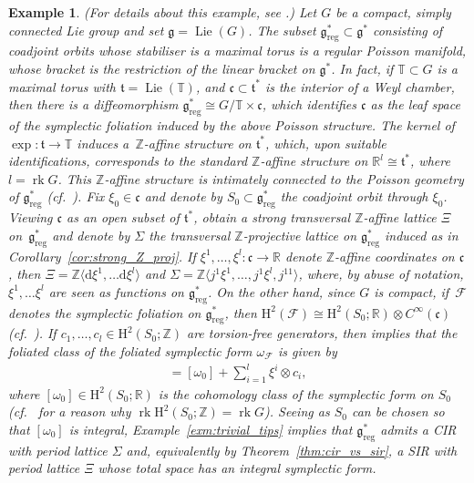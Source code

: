 \documentclass[pdftex]{sigma}
\numberwithin{equation}{section}
\newtheorem{Example}[Theorem]{Example}
\newcommand{\de}{\mathrm{d}} %
\newcommand{\HH}{\mathrm{H}}
\newcommand{\RR}{\mathbb{R}}
\newcommand{\ZZ}{\mathbb{Z}}
\begin{document}
\begin{Example}\label{exm:cpc_ss_Lie_algebras} (For details about this example, see \cite[Section~4.5.1]{PMCT2}.) Let $G$ be a compact, simply connected Lie group and set $\mathfrak{g} = \operatorname{Lie}(G)$. The subset $\mathfrak{g}^*_{\mathrm{reg}} \subset \mathfrak{g}^*$ consisting of coadjoint orbits whose stabiliser is a maximal torus is a regular Poisson manifold, whose bracket is the restriction of the linear bracket on $\mathfrak{g}^*$. In fact, if $\mathbb{T} \subset G$ is a maximal torus with $\mathfrak{t} = \operatorname{Lie}(\mathbb{T})$, and $\mathfrak{c} \subset \mathfrak{t}^*$ is the interior of a Weyl chamber, then there is a dif\/feomorphism $\mathfrak{g}^*_{\mathrm{reg}} \cong G/\mathbb{T} \times \mathfrak{c}$, which identif\/ies $\mathfrak{c}$ as the leaf space of the symplectic foliation induced by the above Poisson structure. The kernel of $\exp \colon \mathfrak{t} \to \mathbb{T}$ induces a~$\ZZ$-af\/f\/ine structure on $\mathfrak{t}^*$, which, upon suitable identif\/ications, corresponds to the standard $\ZZ$-af\/f\/ine structure on $\RR^l \cong \mathfrak{t}^*$, where $l = \operatorname{rk} G$. This $\ZZ$-af\/f\/ine structure is intimately connected to the Poisson geometry of $\mathfrak{g}_{\mathrm{reg}}^*$ (cf.\ \cite[Section~4.5.1]{PMCT2}). Fix $\xi_0 \in \mathfrak{c}$ and denote by $S_0 \subset \mathfrak{g}^*_{\mathrm{reg}}$ the coadjoint orbit through $\xi_0$. Viewing $\mathfrak{c} $ as an open subset of $ \mathfrak{t}^*$, obtain a strong transversal $\ZZ$-af\/f\/ine lattice $\Xi$ on~$\mathfrak{g}^*_{\mathrm{reg}}$ and denote by $\Sigma$ the transversal $\ZZ$-projective lattice on $\mathfrak{g}^*_{\mathrm{reg}}$ induced as in Corollary~\ref{cor:strong_Z_proj}. If $\xi^1,\ldots,\xi^l\colon \mathfrak{c} \to \RR$ denote $\ZZ$-af\/f\/ine coordinates on $\mathfrak{c}$, then $\Xi = \ZZ \langle \de \xi^1,\ldots \de \xi^l\rangle $ and $\Sigma = \ZZ \langle j^1\xi^1,\ldots,j^1\xi^l,j^11\rangle$, where, by abuse of notation, $\xi^1,\ldots \xi^l$ are seen as functions on $\mathfrak{g}^*_{\mathrm{reg}}$. On the other hand, since $G$ is compact, if~$\mathcal{F}$ denotes the symplectic foliation on $\mathfrak{g}^*_{\mathrm{reg}}$, then $\HH^2(\mathcal{F}) \cong \HH^2(S_0;\RR) \otimes C^{\infty}(\mathfrak{c})$ (cf.\ \cite{kacimi}). If $c_1,\ldots,c_l \in \HH^2(S_0;\ZZ)$ are torsion-free generators, then \cite[Remark~4.3.5]{PMCT2} implies that the foliated class of the foliated symplectic form
 $\omega_{\mathcal{F}}$ is given by
 \begin{gather*}
 [\omega_{\mathcal{F}}] = [\omega_0] + \sum\limits_{i=1}^l \xi^i \otimes c_i,
 \end{gather*}
where $[\omega_0] \in \HH^2(S_0;\RR)$ is the cohomology class of the symplectic form on $S_0$ (cf.\ \cite[Section~4.5.1]{PMCT2} for a reason why $\operatorname{rk} \HH^2(S_0;\ZZ) = \operatorname{rk} G$). Seeing as $S_0$ can be chosen so that $[\omega_0]$ is integral, Example~\ref{exm:trivial_tips} implies that $\mathfrak{g}^*_{\mathrm{reg}}$ admits a CIR with period lattice $\Sigma$ and, equivalently by Theorem~\ref{thm:cir_vs_sir}, a SIR with period lattice $\Xi$ whose total space has an integral symplectic form.


\end{Example}
\end{document}
